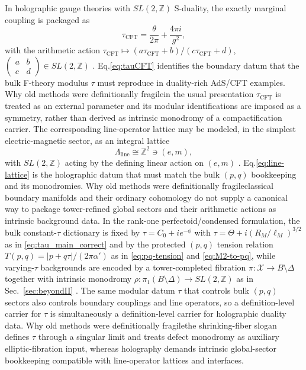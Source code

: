 \documentclass[11pt]{article}
\theoremstyle{remark}
\newcommand{\Z}{\mathbb{Z}}
\begin{document}
In holographic gauge theories with \(SL(2,\Z)\) S-duality, the exactly marginal coupling is packaged as
\begin{equation}\label{eq:tauCFT}
\tau_{\mathrm{CFT}}=\frac{\theta}{2\pi}+\frac{4\pi i}{g^{2}},
\end{equation}
with the arithmetic action \(\tau_{\mathrm{CFT}}\mapsto (a\tau_{\mathrm{CFT}}+b)/(c\tau_{\mathrm{CFT}}+d)\), \(\begin{pmatrix}a&b\\c&d\end{pmatrix}\in SL(2,\Z)\) \cite{Schwarz1995}. Eq.\eqref{eq:tauCFT} identifies the boundary datum that the bulk F-theory modulus \(\tau\) must reproduce in duality-rich AdS/CFT examples. Why old methods were definitionally fragile\:in the usual presentation \(\tau_{\mathrm{CFT}}\) is treated as an external parameter and its modular identifications are imposed as a symmetry, rather than derived as intrinsic monodromy of a compactification carrier. The corresponding line-operator lattice may be modeled, in the simplest electric-magnetic sector, as an integral lattice
\begin{equation}\label{eq:line-lattice}
\Lambda_{\mathrm{line}}\cong \Z^{2}\ni (e,m),
\end{equation}
with \(SL(2,\Z)\) acting by the defining linear action on \((e,m)\) \cite{Schwarz1995}. Eq.\eqref{eq:line-lattice} is the holographic datum that must match the bulk \((p,q)\) bookkeeping and its monodromies. Why old methods were definitionally fragile\:classical boundary manifolds and their ordinary cohomology do not supply a canonical way to package tower-refined global sectors and their arithmetic actions as intrinsic background data. In the rank-one perfectoid/condensed formulation, the bulk constant-\(\tau\) dictionary is fixed by \(\tau=C_{0}+ie^{-\phi}\) with \(\tau=\Theta+i(R_{M}/\ell_{M})^{3/2}\) as in \eqref{eq:tau_main_correct} and by the protected \((p,q)\) tension relation \(T(p,q)=|p+q\tau|/(2\pi\alpha')\) as in \eqref{eq:pq-tension} and \eqref{eq:M2-to-pq}, while varying-\(\tau\) backgrounds are encoded by a tower-completed fibration \(\pi:\mathcal{X}\to B\setminus\Delta\) together with intrinsic monodromy \(\rho:\pi_{1}(B\setminus\Delta)\to SL(2,\Z)\) as in Sec.~\ref{sec:beyondII} \cite{Vafa1996}. The same modular datum \(\tau\) that controls bulk \((p,q)\) sectors also controls boundary couplings and line operators, so a definition-level carrier for \(\tau\) is simultaneously a definition-level carrier for holographic duality data. Why old methods were definitionally fragile\:the shrinking-fiber slogan defines \(\tau\) through a singular limit and treats defect monodromy as auxiliary elliptic-fibration input, whereas holography demands intrinsic global-sector bookkeeping compatible with line-operator lattices and interfaces.
\end{document}
